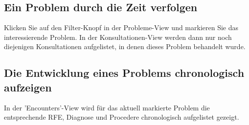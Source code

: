 \documentclass[a4paper]{scrartcl}
\begin{document}
\subsection{Ein Problem durch die Zeit verfolgen}
Klicken Sie auf den Filter-Knopf in der Probleme-View und markieren Sie das interessierende Problem.  In der Konsultationen-View werden dann nur noch diejenigen Konsultationen aufgelistet, in denen dieses Problem behandelt wurde.

\subsection{Die Entwicklung eines Problems chronologisch aufzeigen}
In der 'Encounters'-View wird für das aktuell markierte Problem die entsprechende RFE, Diagnose und Procedere chronologisch aufgelistet gezeigt.
\end{document}
